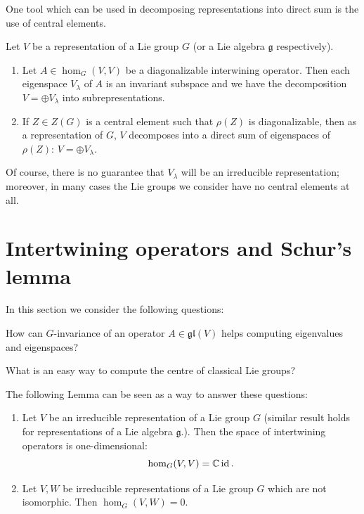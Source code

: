 \documentclass{report}
\begin{document}
One tool which can be used in decomposing representations into direct sum
is the use of central elements.
\begin{lemma}
    Let $V$ be a representation of a Lie group $G$ (or a Lie algebra $\mathfrak g$ respectively).
    \begin{enumerate}[label = (\roman*)]
        \item Let $A \in \hom_G(V, V)$ be a diagonalizable interwining operator. 
        Then each eigenspace $V_\lambda$ of $A$ is an invariant subspace and we have the decomposition $V = \oplus V_\lambda$ into subrepresentations.
        \item If $Z \in Z(G)$ is a central element such that $\rho(Z)$ is diagonalizable, then as a representation of $G$, $V$ decomposes into a direct sum of eigenspaces of $\rho(Z)$: $V = \oplus V_\lambda$. 
    \end{enumerate} 
\end{lemma}

Of course, there is no guarantee that $V_\lambda$ will be an irreducible representation;
moreover, in many cases the Lie groups we consider have no central elements
at all.

\section{Intertwining operators and Schur’s lemma}
In this section we consider the following questions:
\begin{question}\label{q:invariance_eigenvalues}
How can $G$-invariance of an operator $A \in \mathfrak{gl}(V)$ helps computing eigenvalues and eigenspaces?
\end{question}

\begin{question}\label{q:centre_classical_lie_groups}
    What is an easy way to compute the centre of classical Lie groups?
\end{question} 

The following Lemma can be seen as a way to answer these questions:
\begin{lemma}
    \begin{enumerate}[label = (\roman*)]
        \item Let $V$ be an irreducible representation of a Lie group $G$ (similar result holds for representations of a Lie algebra $\mathfrak g$.).
        Then the space of intertwining operators is one-dimensional:
        \[
        \hom_G(V, V) = \mathbb C \operatorname{id}.
        \]
        \item Let $V, W$ be irreducible representations of a Lie group $G$ which are not isomorphic.
        Then $\hom_G(V, W) = 0$.
    \end{enumerate}
\end{lemma}
\end{document}
